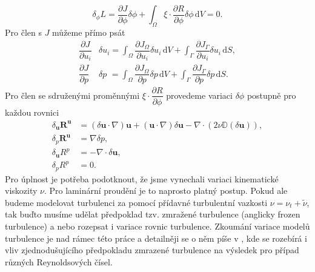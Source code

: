 \begin{equation} \label{eq:sdruzena_variace}
\delta_\phi L = 
\frac{\partial J}{\partial \phi}\delta\phi
+
\int_{\Omega} 
\xi \cdot \dfrac{\partial R}{\partial \phi}  \delta\phi 
\, \mathrm{d}V
 = 0.
\end{equation}
Pro člen s $ J $ můžeme přímo psát
\begin{align}
\dfrac{\partial J}{\partial u_i}& \delta u_i = \int_{\Omega} \dfrac{\partial J_{\Omega}}{\partial u_i} \delta u_i \, \mathrm{d}V + \int_{\Gamma} \dfrac{\partial J_{\Gamma}}{\partial u_i} \delta u_i \, \mathrm{d}S, \\
\dfrac{\partial J}{\partial p} &\delta p \,\,= \int_{\Omega} \dfrac{\partial J_{\Omega}}{\partial p} \delta p  \, \mathrm{d}V + \int_{\Gamma} \dfrac{\partial J_{\Gamma}}{\partial p} \delta p  \, \mathrm{d}S.
\end{align}
Pro člen se sdruženými proměnnými $ \xi \cdot \dfrac{\partial R}{\partial \phi} $ provedeme variaci $ \delta\phi $ postupně pro každou rovnici
\begin{align}
\delta_\mathbf{u} \mathbf{R^u}&=
(\delta \mathbf{u}\cdot \nabla )\mathbf{u} + (\mathbf{u}\cdot \nabla )\delta\mathbf{u} - \nabla \cdot (2\nu \mathbb{D}(\delta \mathbf{u}) ) ,\\
\delta_p \mathbf{R^u}&= \nabla \delta p,\\
\delta_\mathbf{u}R^p &= -\nabla \cdot \delta \mathbf{u} ,\\
\delta_p R^p &= 0.
\end{align}
Pro úplnost je potřeba podotknout, že jsme vynechali variaci kinematické viskozity $ \nu $. 
Pro laminární proudění je to naprosto platný postup. 
Pokud ale budeme modelovat turbulenci za pomocí přídavné turbulentní vazkosti $ \nu = \nu_t + \widetilde{\nu} $, tak buďto musíme udělat předpoklad tzv. zmražené turbulence (anglicky frozen turbulence) a nebo rozepsat i variace rovnic turbulence. Zkoumání variace modelů turbulence je nad rámec této práce a detailněji se o něm píše v \cite{zymaris2009continuous}, kde se rozebírá i vliv zjednodušujícího předpokladu zmrazené turbulence na výsledek pro případ různých Reynoldsových čísel. 

